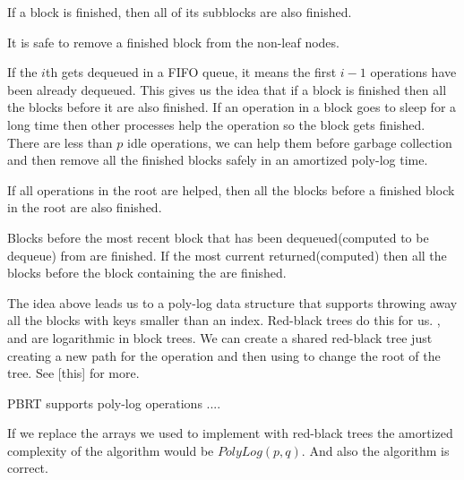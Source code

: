 \begin{corollary}
If a block is finished, then all of its subblocks are also finished.  
\end{corollary}

\begin{lemma}
It is safe to remove a finished block from the non-leaf nodes.
\end{lemma}

If the $i$th  gets dequeued in a FIFO queue, it means the first $i-1$  operations have been already dequeued. This gives us the idea that if a block is finished then all the blocks before it are also finished. If an operation in a block goes to sleep for a long time then other processes help the operation so the block gets finished. There are less than $p$ idle operations, we can help them before garbage collection and then remove all the finished blocks safely in an amortized poly-log time.

\begin{lemma}
    If all  operations in the root are helped, then all the blocks before a finished block in the root are also finished.
\end{lemma}

\begin{lemma}
  Blocks before the most recent block that has been dequeued(computed to be dequeue) from are finished. If the most current  returned(computed)  then all the blocks before the block containing the  are finished.
\end{lemma}

The idea above leads us to a poly-log data structure that supports throwing away all the blocks with keys smaller than an index. Red-black trees do this for us. ,  and  are logarithmic in block trees.
We can create a shared red-black tree just creating a new path for the operation and then using  to change the root of the tree. See [this] for more.

\begin{observation}
PBRT supports poly-log operations ....
\end{observation}

\begin{lemma}
    If we replace the arrays we used to implement  with red-black trees the amortized complexity of the algorithm would be $PolyLog(p,q)$. And also the algorithm is correct.
\end{lemma}


